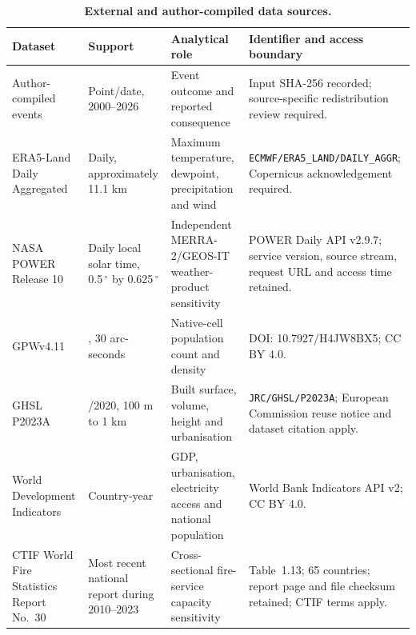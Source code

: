 \documentclass[11pt]{article}
\begin{document}
\begin{longtable}{>{\raggedright\arraybackslash}p{}>{\raggedright\arraybackslash}p{}>{\raggedright\arraybackslash}p{}>{\raggedright\arraybackslash}p{}}
\caption{\textbf{External and author-compiled data sources.}}\label{tab:s3}\\
\toprule
Dataset & Support & Analytical role & Identifier and access boundary\\
\midrule
Author-compiled events & Point/date, 2000--2026 & Event outcome and reported consequence & Input SHA-256 recorded; source-specific redistribution review required.\\
ERA5-Land Daily Aggregated & Daily, approximately 11.1 km & Maximum temperature, dewpoint, precipitation and wind & \texttt{ECMWF/ERA5\_LAND/}\newline\texttt{DAILY\_AGGR}; Copernicus acknowledgement required.\\
NASA POWER Release 10 & Daily local solar time, 0.5\,$^\circ$ by 0.625\,$^\circ$ & Independent MERRA-2/GEOS-IT weather-product sensitivity & POWER Daily API v2.9.7; service version, source stream, request URL and access time retained.\\
GPWv4.11 & 2020, 30 arc-seconds & Native-cell population count and density & DOI: 10.7927/H4JW8BX5; CC BY 4.0.\\
GHSL P2023A & 2018/2020, 100 m to 1 km & Built surface, volume, height and urbanisation & \texttt{JRC/GHSL/}\newline\texttt{P2023A}; European Commission reuse notice and dataset citation apply.\\
World Development Indicators & Country-year & GDP, urbanisation, electricity access and national population & World Bank Indicators API v2; CC BY 4.0.\\
CTIF World Fire Statistics Report No.~30 & Most recent national report during 2010--2023 & Cross-sectional fire-service capacity sensitivity & Table~1.13; 65 countries; report page and file checksum retained; CTIF terms apply.\\
\bottomrule
\end{longtable}
\end{document}
